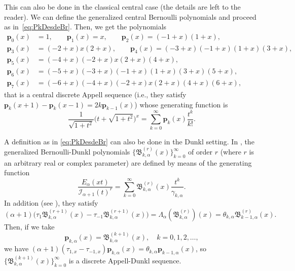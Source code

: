 \documentclass[11pt]{article}
\theoremstyle{plain}
\theoremstyle{remark}
\numberwithin{equation}{section} %
\newcommand{\Ea}{E_{\alpha}}
\newcommand{\La}{\Lambda_{\alpha}}
\newcommand{\I}{\mathcal{I}}
\newcommand{\B}{\mathfrak{B}}
\newcommand{\cc}{\gamma}
\begin{document}
This can also be done in the classical central case (the details are left to the reader). We can define the generalized central Bernoulli polynomials and proceed as in~\eqref{eq:PkDesdeBr}. Then, we get the polynomials 
\begin{equation}
\label{eq:disgenc}
\begin{aligned}
\mathbf{p}_{0}(x) &= 1, \qquad
\mathbf{p}_{1}(x) = x, \qquad
\mathbf{p}_{2}(x) = (-1 + x) (1 + x), \\
\mathbf{p}_{3}(x) &= (-2 + x) x (2 + x), \qquad
\mathbf{p}_{4}(x) = (-3 + x) (-1 + x) (1 + x) (3 + x), \\
\mathbf{p}_{5}(x) &= (-4 + x) (-2 + x) x (2 + x) (4 + x), \\
\mathbf{p}_{6}(x) &= (-5 + x) (-3 + x) (-1 + x) (1 + x) (3 + x) (5 + x), \\
\mathbf{p}_{7}(x) &= (-6 + x) (-4 + x) (-2 + x) x (2 + x) (4 + x) (6 + x),
\end{aligned}
\end{equation}
that is a central discrete Appell sequence 
(i.e., they satisfy $\mathbf{p}_{k}(x+1)-\mathbf{p}_{k}(x-1) = 2k\mathbf{p}_{k-1}(x)$)
whose generating function is
\begin{equation}
\label{eq:disgenAc}
  \frac{1}{\sqrt{1+t^2}} \big(t + \sqrt{1+t^2}\big)^x 
  = \sum_{k=0}^{\infty} \mathbf{p}_k(x) \frac{t^k}{k!}.
\end{equation} 

A definition as in \eqref{eq:PkDesdeBr} can also be done in the Dunkl setting. In \cite{CMV}, the generalized Bernoulli-Dunkl polynomials $\{\B_{k,\alpha}^{(r)}(x)\}_{k=0}^{\infty}$ of order $r$ (where $r$ is an arbitrary real or complex parameter) are defined by means of the generating function
\begin{equation}
\label{eq:defbdr}
  \frac{\Ea(xt)}{\I_{\alpha+1}(t)^r}
  = \sum_{k=0}^\infty \B_{k,\alpha}^{(r)}(x) \frac{t^k}{\cc_{k,\alpha}}.
\end{equation}
In addition (see \cite[Theorem 8.2]{CMV}), they satisfy
\begin{equation}
\label{eq:tau1-1-Br}
  (\alpha+1)\big(\tau_1 \B_{k,\alpha}^{(r+1)}(x) - \tau_{-1} \B_{k,\alpha}^{(r+1)}(x)\big)
  = \La(\B_{k,\alpha}^{(r)})(x) = \theta_{k,\alpha} \B_{k-1,\alpha}^{(r)}(x).
\end{equation}
Then, if we take
\begin{equation}
\label{eq:PnDesdeBrD}
  \mathbf{p}_{k,\alpha}(x) = \B_{k,\alpha}^{(k+1)}(x), \quad k=0,1,2,\dots,
\end{equation}
we have $(\alpha+1)(\tau_{1,x}-\tau_{-1,x}) \mathbf{p}_{k,\alpha}(x) 
= \theta_{k,\alpha} \mathbf{p}_{k-1,\alpha}(x)$,
so $\{\B_{k,\alpha}^{(k+1)}(x)\}_{k=0}^{\infty}$ is a discrete Appell-Dunkl sequence.
\end{document}
